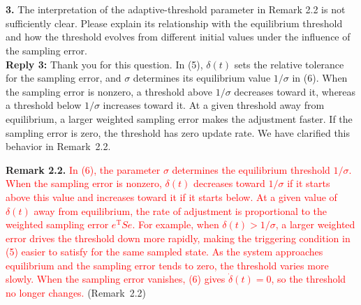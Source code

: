 \documentclass[10pt,fleqn]{article}
\begin{document}
~\\
\\
\textbf{3.} The interpretation of the adaptive-threshold parameter in Remark 2.2 is not sufficiently clear. Please explain its relationship with the equilibrium threshold and how the threshold evolves from different initial values under the influence of the sampling error.
\\[10pt]
\begingroup
\setlength{\parskip}{6pt}
\indent \textbf{Reply 3:} Thank you for this question. In (5), $\delta(t)$ sets the relative tolerance for the sampling error, and $\sigma$ determines its equilibrium value $1/\sigma$ in (6). When the sampling error is nonzero, a threshold above $1/\sigma$ decreases toward it, whereas a threshold below $1/\sigma$ increases toward it. At a given threshold away from equilibrium, a larger weighted sampling error makes the adjustment faster. If the sampling error is zero, the threshold has zero update rate. We have clarified this behavior in Remark~2.2.\par
\noindent \textbf{Remark 2.2.} \textcolor{red}{In (6), the parameter $\sigma$ determines the equilibrium threshold $1/\sigma$. When the sampling error is nonzero, $\delta(t)$ decreases toward $1/\sigma$ if it starts above this value and increases toward it if it starts below. At a given value of $\delta(t)$ away from equilibrium, the rate of adjustment is proportional to the weighted sampling error $e^{\mathrm{T}}Se$. For example, when $\delta(t)>1/\sigma$, a larger weighted error drives the threshold down more rapidly, making the triggering condition in (5) easier to satisfy for the same sampled state. As the system approaches equilibrium and the sampling error tends to zero, the threshold varies more slowly. When the sampling error vanishes, (6) gives $\dot{\delta}(t)=0$, so the threshold no longer changes.} \mbox{(Remark~2.2)}\par
\endgroup
\end{document}
